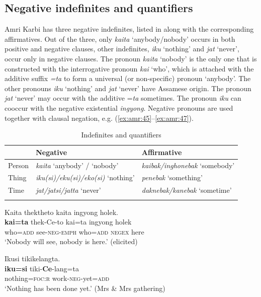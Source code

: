 \documentclass[output=paper,colorlinks,citecolor=brown]{langscibook}
\begin{document}
\subsection{Negative indefinites and quantifiers} \label{sec:amr:3.2} 

Amri Karbi has three negative indefinites, listed in  along with the corresponding affirmatives. Out of the three, only \textit{kaita} ‘anybody/nobody’ occurs in both positive and negative clauses, other indefinites, \textit{iku} ‘nothing’ and \textit{jat} ‘never’, occur only in negative clauses. The pronoun \textit{kaita} ‘nobody’ is the only one that is constructed with the interrogative pronoun \textit{kai} ‘who’, which is attached with the additive suffix \textit{=ta} to form a universal (or non-specific) pronoun ‘anybody’. The other pronouns \textit{iku} ‘nothing’ and \textit{jat} ‘never’ have Assamese origin. The pronoun \textit{jat} ‘never’ may occur with the additive =\textit{ta} sometimes. The pronoun \textit{iku} can cooccur with the negative existential \textit{ingyong}. Negative pronouns are used together with clausal negation, e.g. (\ref{ex:amr:45}--\ref{ex:amr:47}).

\begin{table}
\centering
\begin{tabularx}{.95\textwidth}{lll}
\lsptoprule
 & Negative & Affirmative\\
\midrule
Person  & \textit{kaita} ‘anybody’ / ‘nobody’             & \textit{kaibak/inghonebak} ‘somebody’\\
Thing   & \textit{iku(si)/eku(si)/eko(si)} ‘nothing’    & \textit{penebak} ‘something’\\
Time    & \textit{jat/jatsi/jatta} ‘never’              & \textit{daknebak/kanebak} ‘sometime’\\
\lspbottomrule
\end{tabularx}
\caption{Indefinites and quantifiers}
\label{tab:amr:3}
\end{table}

\ea\label{ex:amr:45}  Kaita thektheto kaita ingyong holek.\\
    \gll \textbf{kai=ta} thek-Ce-to kai=ta ingyong holek\\
          who=\textsc{add} see-\textsc{neg}{}-\textsc{emph} who=\textsc{add} \textsc{negex} here\\
    \glt ‘Nobody will see, nobody is here.’ (elicited)
\z

\ea\label{ex:amr:46} Ikusi tikikelangta. \\
    \gll \textbf{iku=si} tiki-\textbf{C}\textbf{e}{}-lang=ta \\
         nothing=\textsc{foc}:\textsc{r} work-\textsc{neg}{}-yet=\textsc{add} \\
    \glt ‘Nothing has been done yet.’ (Mrs \& Mrs gathering)
\z
\end{document}
